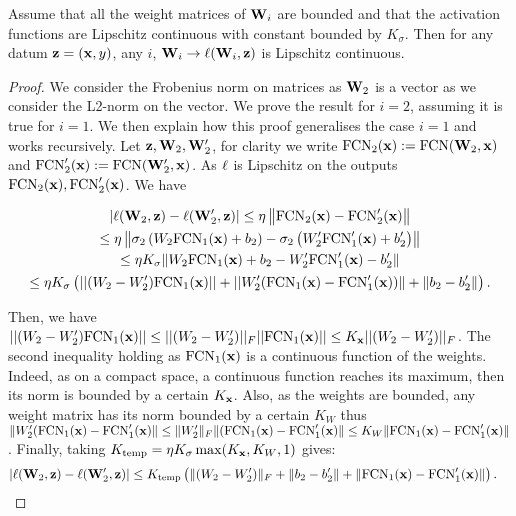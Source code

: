 \begin{noaddcontents}
    \begin{lemma}
        \label{l:lip-nn}
        Assume that all the weight matrices of $\mathbf{W}_i$ are bounded and that the activation functions are Lipschitz continuous with constant bounded by $K_\sigma$.
        Then for any datum $\mathbf{z}= (\mathbf{x},y)$, any $i$, $\mathbf{W}_i\rightarrow\ell(\mathbf{W}_i,\mathbf{z})$ is Lipschitz continuous.
    \end{lemma}
    \begin{proof}
        We consider the Frobenius norm on matrices as $\mathbf{W}_2$ is a vector as we consider the L2-norm on the vector.
        We prove the result for $i=2$, assuming it is true for $i=1$. We then explain how this proof generalises the case $i=1$ and works recursively.
        Let $\mathbf{z},\mathbf{W}_2,\mathbf{W}_2'$, for clarity we write $\text{FCN}_2(\mathbf{x}):= \text{FCN}(\mathbf{W}_2,\mathbf{x})$ and $\text{FCN}_2'(\mathbf{x}):= \text{FCN}(\mathbf{W}_2',\mathbf{x})$. 
        As $\ell$ is Lipschitz on the outputs $\text{FCN}_2(\mathbf{x}), \text{FCN}_2'(\mathbf{x})$. 
        We have
        
        \begin{multline*}
            |\ell(\mathbf{W}_2, \mathbf{z}) - \ell(\mathbf{W}'_2, \mathbf{z}) |  \le \eta \left\|\text{FCN}_2(\mathbf{x})-\text{FCN}_2'(\mathbf{x}) \right\| \\
            \le \eta \left\|\sigma_2\left(W_2\text{FCN}_{1}(\mathbf{x}) +b_2 \right) - \sigma_2\left(W_2'\text{FCN}_{1}'(\mathbf{x}) +b_2' \right) \right\| \\
             \le \eta K_{\sigma}\| W_2\text{FCN}_{1}(\mathbf{x}) +b_2 - W_2'\text{FCN}_{1}'(\mathbf{x}) -b_2'\| \\
             \le \eta K_\sigma\left( ||(W_2- W_2') \text{FCN}_{1}(\mathbf{x}) || + ||W_2'(\text{FCN}_{1}(\mathbf{x})-\text{FCN}_{1}'(\mathbf{x}))\| + \|b_2-b_2'\|  \right).
        \end{multline*}
        
        Then, we have $||(W_2- W_2') \text{FCN}_{1}(\mathbf{x}) || \le ||(W_2- W_2')||_F ||\text{FCN}_1(\mathbf{x})|| \le  K_{\mathbf{x}} ||(W_2- W_2')||_F$. The second inequality holding as $\text{FCN}_1(\mathbf{x})$ is a continuous function of the weights. Indeed, as on a compact space, a continuous function reaches its maximum, then its norm is bounded by a certain $K_{\mathbf{x}}$. 
        Also, as the weights are bounded, any weight matrix has its norm bounded by a certain $K_{W}$ thus $\|W_2'(\text{FCN}_{1}(\mathbf{x})-\text{FCN}_{1}'(\mathbf{x})\| \le \|W_2'\|_F\|(\text{FCN}_{1}(\mathbf{x})-\text{FCN}_{1}'(\mathbf{x})\| \le K_{W}\|\text{FCN}_{1}(\mathbf{x})-\text{FCN}_{1}'(\mathbf{x})\|$. Finally, taking $K_{\text{temp}}= \eta K_{\sigma}\max(K_{\mathbf{x}},K_W,1)$ gives: 
        \begin{align*}
            |\ell(\mathbf{W}_2, \mathbf{z}) - \ell(\mathbf{W}'_2, \mathbf{z}) |
            &\le K_{\text{temp}} \left(\|(W_2- W_2')\|_F + \|b_2-b_2'\| + \|\text{FCN}_{1}(\mathbf{x})-\text{FCN}_{1}'(\mathbf{x})\|\right).
        \end{align*}  
    

\end{proof}
\end{noaddcontents}
